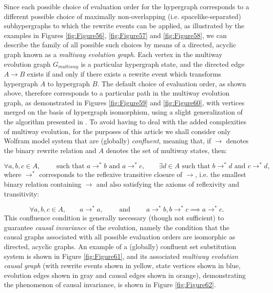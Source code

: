\documentclass{article}
\begin{document}
Since each possible choice of evaluation order for the hypergraph corresponds to a different possible choice of maximally non-overlapping (i.e. spacelike-separated) subhypergraphs to which the rewrite events can be applied, as illustrated by the examples in Figures \ref{fig:Figure56}, \ref{fig:Figure57} and \ref{fig:Figure58}, we can describe the family of all possible such choices by means of a directed, acyclic graph known as a \textit{multiway evolution graph}. Each vertex in the multiway evolution graph ${G_{multiway}}$ is a particular hypergraph state, and the directed edge ${A \to B}$ exists if and only if there exists a rewrite event which transforms hypergraph $A$ to hypergraph $B$. The default choice of evaluation order, as shown above, therefore corresponds to a particular path in the multiway evolution graph, as demonstrated in Figures \ref{fig:Figure59} and \ref{fig:Figure60}, with vertices merged on the basis of hypergraph isomorphism, using a slight generalization of the algorithm presented in \cite{gorard5}. To avoid having to deal with the added complexities of multiway evolution, for the purposes of this article we shall consider only Wolfram model system that are (globally) \textit{confluent}\cite{dershowitz}\cite{huet}, meaning that, if ${\to}$ denotes the binary rewrite relation and $A$ denotes the set of multiway states, then:

\begin{equation}
\forall a, b, c \in A , \qquad \text{ such that } a \to^{*} b \text{ and } a \to^{*} c, \qquad \exists d \in A \text{ such that } b \to^{*} d \text{ and } c \to^{*} d,
\end{equation}
where ${\to^{*}}$ corresponds to the reflexive transitive closure of ${\to}$, i.e. the smallest binary relation containing ${\to}$ and also satisfying the axioms of reflexivity and transitivity:

\begin{equation}
\forall a, b, c \in A, \qquad a \to^{*} a, \qquad \text{ and } \qquad a \to^{*} b, b \to^{*} c \implies a \to^{*} c.
\end{equation}
This confluence condition is generally necessary (though not sufficient) to guarantee \textit{causal invariance} of the evolution, namely the condition that the causal graphs associated with all possible evaluation orders are isomorphic as directed, acyclic graphs. An example of a (globally) confluent set substitution system is shown in Figure \ref{fig:Figure61}, and its associated \textit{multiway evolution causal graph} (with rewrite events shown in yellow, state vertices shown in blue, evolution edges shown in gray and causal edges shown in orange), demonstrating the phenomenon of causal invariance, is shown in Figure \ref{fig:Figure62}.
\end{document}
